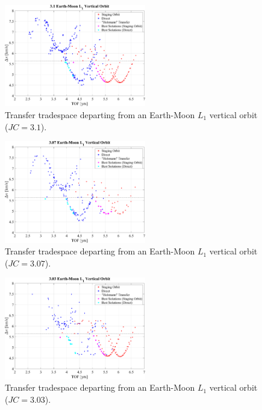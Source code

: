 \begin{figure}[ht]
    \centering
    \includegraphics[width=0.55\textwidth]{figures/TradeSpace_L1Vertical_3_10.pdf}
    \caption{Transfer tradespace departing from an Earth-Moon $L_{1}$ vertical orbit ($JC=3.1$).}
\end{figure}

\begin{figure}[ht]
    \centering
    \includegraphics[width=0.55\textwidth]{figures/TradeSpace_L1Vertical_3_07.pdf}
    \caption{Transfer tradespace departing from an Earth-Moon $L_{1}$ vertical orbit ($JC=3.07$).}
\end{figure}
\clearpage

\begin{figure}[ht]
    \centering
    \includegraphics[width=0.55\textwidth]{figures/TradeSpace_L1Vertical_3_03.pdf}
    \caption{Transfer tradespace departing from an Earth-Moon $L_{1}$ vertical orbit ($JC=3.03$).}
\end{figure}

